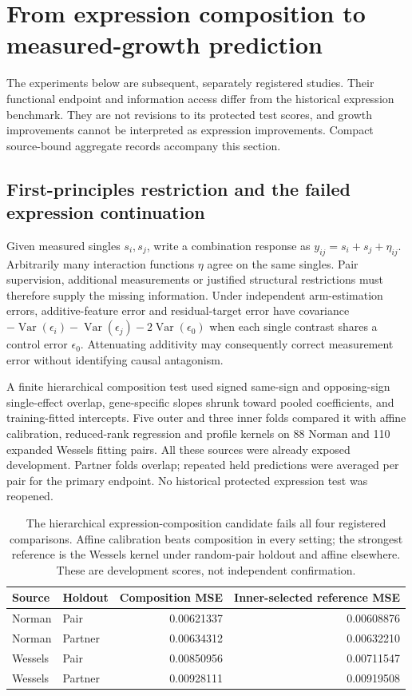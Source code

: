 \section{From expression composition to measured-growth prediction}
\label{sec:growth}
The experiments below are subsequent, separately registered studies. Their functional endpoint and information access differ from the historical expression benchmark. They are not revisions to its protected test scores, and growth improvements cannot be interpreted as expression improvements. Compact source-bound aggregate records accompany this section.

\subsection{First-principles restriction and the failed expression continuation}
Given measured singles $s_i,s_j$, write a combination response as $y_{ij}=s_i+s_j+\eta_{ij}$. Arbitrarily many interaction functions $\eta$ agree on the same singles. Pair supervision, additional measurements or justified structural restrictions must therefore supply the missing information. Under independent arm-estimation errors, additive-feature error and residual-target error have covariance $-\operatorname{Var}(\epsilon_i)-\operatorname{Var}(\epsilon_j)-2\operatorname{Var}(\epsilon_0)$ when each single contrast shares a control error $\epsilon_0$. Attenuating additivity may consequently correct measurement error without identifying causal antagonism.

A finite hierarchical composition test used signed same-sign and opposing-sign single-effect overlap, gene-specific slopes shrunk toward pooled coefficients, and training-fitted intercepts. Five outer and three inner folds compared it with affine calibration, reduced-rank regression and profile kernels on 88 Norman and 110 expanded Wessels fitting pairs. All these sources were already exposed development. Partner folds overlap; repeated held predictions were averaged per pair for the primary endpoint. No historical protected expression test was reopened.

\begin{table}[htbp]\centering\small
\begin{tabular}{llrr}\toprule
Source & Holdout & Composition MSE & Inner-selected reference MSE\\\midrule
Norman & Pair & 0.00621337 & 0.00608876\\
Norman & Partner & 0.00634312 & 0.00632210\\
Wessels & Pair & 0.00850956 & 0.00711547\\
Wessels & Partner & 0.00928111 & 0.00919508\\\bottomrule
\end{tabular}
\caption{The hierarchical expression-composition candidate fails all four registered comparisons. Affine calibration beats composition in every setting; the strongest reference is the Wessels kernel under random-pair holdout and affine elsewhere. These are development scores, not independent confirmation.}
\label{tab:composition-update}\end{table}

